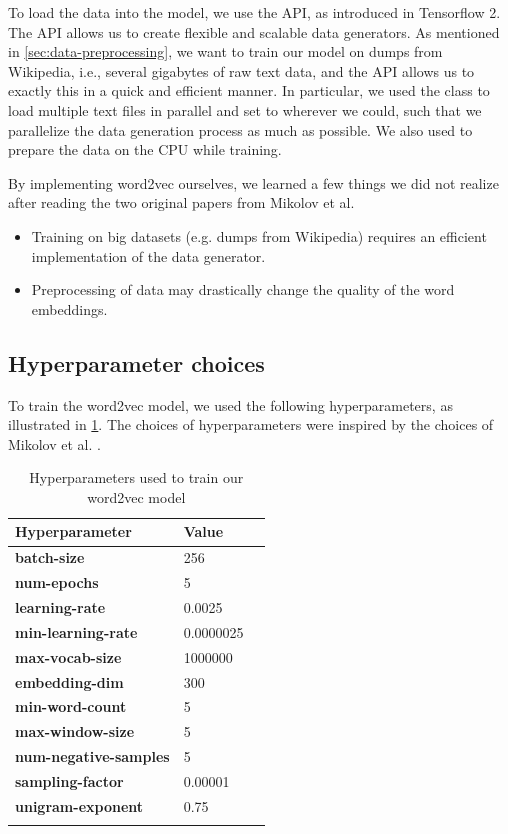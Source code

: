To load the data into the model, we use the  API, as introduced in Tensorflow 2. The  API allows us to create flexible and scalable data generators. As mentioned in \cref{sec:data-preprocessing}, we want to train our model on dumps from Wikipedia, i.e., several gigabytes of raw text data, and the  API allows us to exactly this in a quick and efficient manner. In particular, we used the  class to load multiple text files in parallel and set  to  wherever we could, such that we parallelize the data generation process as much as possible. We also used  to prepare the data on the CPU while training.

By implementing word2vec ourselves, we learned a few things we did not realize after reading the two original papers from Mikolov et al. \cite{mikolov2013a, mikolov2013b}
\begin{itemize}
    \item Training on big datasets (e.g. dumps from Wikipedia) requires an efficient implementation of the data generator.
    \item Preprocessing of data may drastically change the quality of the word embeddings.
\end{itemize}

\subsection{Hyperparameter choices}
\label{sec:hyperparameter-choices}
To train the word2vec model, we used the following hyperparameters, as illustrated in \cref{table:word2vec-hyperparameter-choices}. The choices of hyperparameters were inspired by the choices of Mikolov et al. \cite{mikolov2013a, mikolov2013b}.

\begin{longtable}[]{@{}lll@{}}
\toprule
Hyperparameter & Value\tabularnewline
\midrule
\endhead
\textbf{batch-size} & 256\tabularnewline
\textbf{num-epochs} & 5\tabularnewline
\textbf{learning-rate} & 0.0025\tabularnewline
\textbf{min-learning-rate} & 0.0000025\tabularnewline
\textbf{max-vocab-size} & 1000000\tabularnewline
\textbf{embedding-dim} & 300\tabularnewline
\textbf{min-word-count} & 5\tabularnewline
\textbf{max-window-size} & 5\tabularnewline
\textbf{num-negative-samples} & 5\tabularnewline
\textbf{sampling-factor} & 0.00001\tabularnewline
\textbf{unigram-exponent} & 0.75\tabularnewline
\bottomrule
\caption{Hyperparameters used to train our word2vec model}
\label{table:word2vec-hyperparameter-choices}
\end{longtable}


